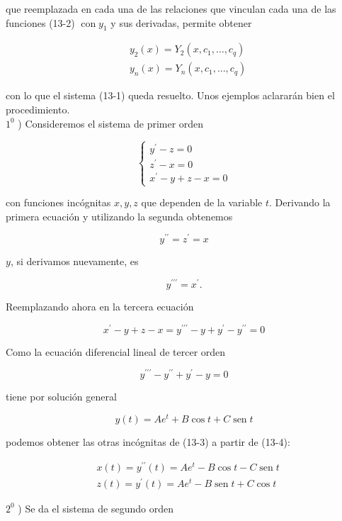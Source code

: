 \documentclass[10pt]{article}
\theoremstyle{plain}
\theoremstyle{definition}
\theoremstyle{remark}
\begin{document}
que reemplazada en cada una de las relaciones que vinculan cada una de las funciones (13-2) $\operatorname{con} y_{1}$ y sus derivadas, permite obtener

$$
\begin{aligned}
& y_{2}(x)=Y_{2}\left(x, c_{1}, \ldots, c_{q}\right) \\
& y_{n}(x)=Y_{n}\left(x, c_{1}, \ldots, c_{q}\right)
\end{aligned}
$$

con lo que el sistema (13-1) queda resuelto. Unos ejemplos aclararán bien el procedimiento.\\
$1^{0}$ ) Consideremos el sistema de primer orden

\[
\left\{\begin{array}{l}
y^{\prime}-z=0  \tag{$13\cdot3$}\\
z^{\prime}-x=0 \\
x^{\prime}-y+z-x=0
\end{array}\right.
\]

con funciones incógnitas $x, y, z$ que dependen de la variable $t$. Derivando la primera ecuación y utilizando la segunda obtenemos


\begin{equation*}
y^{\prime \prime}=z^{\prime}=x \tag{13-4}
\end{equation*}


$y$, si derivamos nuevamente, es

$$
y^{\prime \prime \prime}=x^{\prime} .
$$

Reemplazando ahora en la tercera ecuación

$$
x^{\prime}-y+z-x=y^{\prime \prime \prime}-y+y^{\prime}-y^{\prime \prime}=0
$$

Como la ecuación diferencial lineal de tercer orden

$$
y^{\prime \prime \prime}-y^{\prime \prime}+y^{\prime}-y=0
$$

tiene por solución general

$$
y(t)=A e^{t}+B \cos t+C \operatorname{sen} t
$$

podemos obtener las otras incógnitas de (13-3) a partir de (13-4):

$$
\begin{aligned}
& x(t)=y^{\prime \prime}(t)=A e^{t}-B \cos t-C \operatorname{sen} t \\
& z(t)=y^{\prime}(t)=A e^{t}-B \operatorname{sen} t+C \cos t
\end{aligned}
$$

$2^{0}$ ) Se da el sistema de segundo orden
\end{document}
